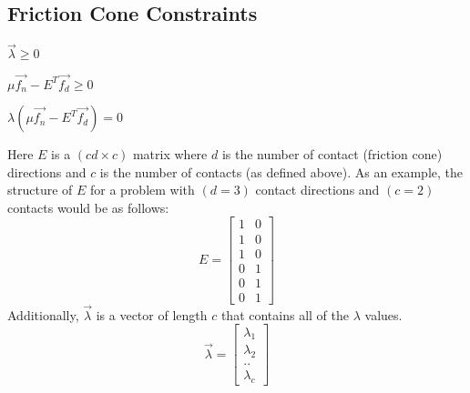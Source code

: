 \subsection{Friction Cone Constraints}
\begin{packed_item}
\item $\vec{\lambda} \geq 0$
\item $\mu\vec{f_n} - E^T\vec{f_d} \geq 0$
\item $\lambda(\mu\vec{f_n} - E^T\vec{f_d}) = 0$
\end{packed_item}
Here $E$ is a $(cd \times c)$ matrix where $d$ is the number of contact (friction cone) directions and $c$ is the number of contacts (as defined above). As an example, the structure of $E$ for a problem with $(d = 3)$ contact directions and $(c = 2)$ contacts would be as follows:
\begin{equation}
\label{eq:ematrix}
E = \left[\begin{matrix}1 & 0 \\ 1 & 0 \\ 1 & 0 \\ 0 & 1 \\ 0 & 1 \\ 0 & 1\end{matrix}\right]
\end{equation}
Additionally, $\vec{\lambda}$ is a vector of length $c$ that contains all of the $\lambda$ values.
\begin{equation}
\label{eq:lambda}
\vec{\lambda} = \left[\begin{matrix}\lambda_1 \\ \lambda_2 \\ .. \\ \lambda_c\end{matrix}\right]
\end{equation}

